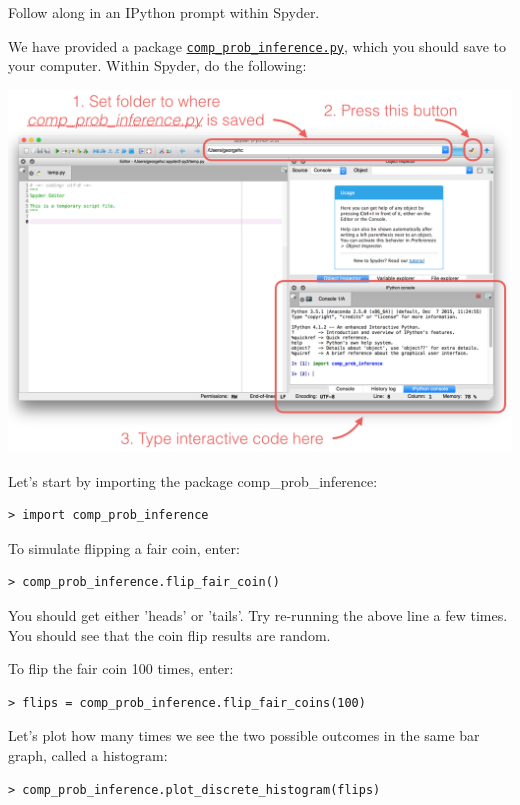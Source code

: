 \documentclass[6008notes.tex]{subfiles}
\begin{document}
Follow along in an IPython prompt within Spyder.

We have provided a package \href{https://d37djvu3ytnwxt.cloudfront.net/assets/courseware/v1/710ba23b569da54c14fc614315ced6a1/asset-v1:MITx+6.008.1x+3T2016+type@asset+block/comp_prob_inference.py}{\texttt{comp\_prob\_inference.py}}, which you should save to your computer. Within Spyder, do the following:

{\centering\includegraphics[scale=0.4]{images_first-look-at-prob-spyder-setup} \par}

Let's start by importing the package comp\_prob\_inference:

\begin{lstlisting}
> import comp_prob_inference
\end{lstlisting}

To simulate flipping a fair coin, enter:

\begin{lstlisting}
> comp_prob_inference.flip_fair_coin()
\end{lstlisting}
You should get either 'heads' or 'tails'. Try re-running the above line a few times. You should see that the coin flip results are random.

To flip the fair coin 100 times, enter:

\begin{lstlisting}
> flips = comp_prob_inference.flip_fair_coins(100)
\end{lstlisting}
Let's plot how many times we see the two possible outcomes in the same bar graph, called a histogram:

\begin{lstlisting}
> comp_prob_inference.plot_discrete_histogram(flips)
\end{lstlisting}
\end{document}
